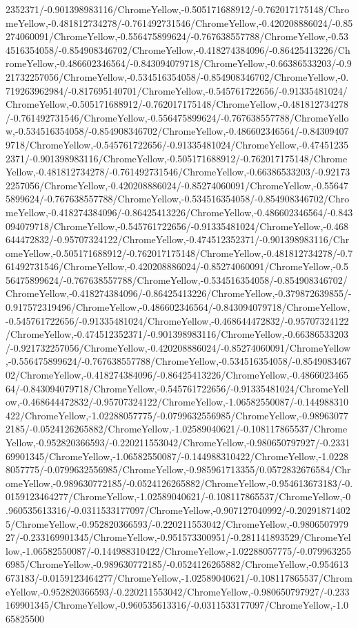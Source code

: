 {\begin{tikzternal}
2352371/-0.901398983116/ChromeYellow,-0.505171688912/-0.762017175148/ChromeYellow,-0.481812734278/-0.761492731546/ChromeYellow,-0.420208886024/-0.85274060091/ChromeYellow,-0.556475899624/-0.767638557788/ChromeYellow,-0.534516354058/-0.854908346702/ChromeYellow,-0.418274384096/-0.86425413226/ChromeYellow,-0.486602346564/-0.843094079718/ChromeYellow,-0.66386533203/-0.921732257056/ChromeYellow,-0.534516354058/-0.854908346702/ChromeYellow,-0.719263962984/-0.817695140701/ChromeYellow,-0.545761722656/-0.91335481024/ChromeYellow,-0.505171688912/-0.762017175148/ChromeYellow,-0.481812734278/-0.761492731546/ChromeYellow,-0.556475899624/-0.767638557788/ChromeYellow,-0.534516354058/-0.854908346702/ChromeYellow,-0.486602346564/-0.843094079718/ChromeYellow,-0.545761722656/-0.91335481024/ChromeYellow,-0.474512352371/-0.901398983116/ChromeYellow,-0.505171688912/-0.762017175148/ChromeYellow,-0.481812734278/-0.761492731546/ChromeYellow,-0.66386533203/-0.921732257056/ChromeYellow,-0.420208886024/-0.85274060091/ChromeYellow,-0.556475899624/-0.767638557788/ChromeYellow,-0.534516354058/-0.854908346702/ChromeYellow,-0.418274384096/-0.86425413226/ChromeYellow,-0.486602346564/-0.843094079718/ChromeYellow,-0.545761722656/-0.91335481024/ChromeYellow,-0.468644472832/-0.95707324122/ChromeYellow,-0.474512352371/-0.901398983116/ChromeYellow,-0.505171688912/-0.762017175148/ChromeYellow,-0.481812734278/-0.761492731546/ChromeYellow,-0.420208886024/-0.85274060091/ChromeYellow,-0.556475899624/-0.767638557788/ChromeYellow,-0.534516354058/-0.854908346702/ChromeYellow,-0.418274384096/-0.86425413226/ChromeYellow,-0.379872639855/-0.917572319496/ChromeYellow,-0.486602346564/-0.843094079718/ChromeYellow,-0.545761722656/-0.91335481024/ChromeYellow,-0.468644472832/-0.95707324122/ChromeYellow,-0.474512352371/-0.901398983116/ChromeYellow,-0.66386533203/-0.921732257056/ChromeYellow,-0.420208886024/-0.85274060091/ChromeYellow,-0.556475899624/-0.767638557788/ChromeYellow,-0.534516354058/-0.854908346702/ChromeYellow,-0.418274384096/-0.86425413226/ChromeYellow,-0.486602346564/-0.843094079718/ChromeYellow,-0.545761722656/-0.91335481024/ChromeYellow,-0.468644472832/-0.95707324122/ChromeYellow,-1.06582550087/-0.144988310422/ChromeYellow,-1.02288057775/-0.0799632556985/ChromeYellow,-0.989630772185/-0.0524126265882/ChromeYellow,-1.02589040621/-0.108117865537/ChromeYellow,-0.952820366593/-0.220211553042/ChromeYellow,-0.980650797927/-0.233169901345/ChromeYellow,-1.06582550087/-0.144988310422/ChromeYellow,-1.02288057775/-0.0799632556985/ChromeYellow,-0.985961713355/0.0572832676584/ChromeYellow,-0.989630772185/-0.0524126265882/ChromeYellow,-0.954613673183/-0.0159123464277/ChromeYellow,-1.02589040621/-0.108117865537/ChromeYellow,-0.960535613316/-0.0311533177097/ChromeYellow,-0.907127040992/-0.202918714025/ChromeYellow,-0.952820366593/-0.220211553042/ChromeYellow,-0.980650797927/-0.233169901345/ChromeYellow,-0.951573300951/-0.281141893529/ChromeYellow,-1.06582550087/-0.144988310422/ChromeYellow,-1.02288057775/-0.0799632556985/ChromeYellow,-0.989630772185/-0.0524126265882/ChromeYellow,-0.954613673183/-0.0159123464277/ChromeYellow,-1.02589040621/-0.108117865537/ChromeYellow,-0.952820366593/-0.220211553042/ChromeYellow,-0.980650797927/-0.233169901345/ChromeYellow,-0.960535613316/-0.0311533177097/ChromeYellow,-1.065825500
\end{tikzternal}}
